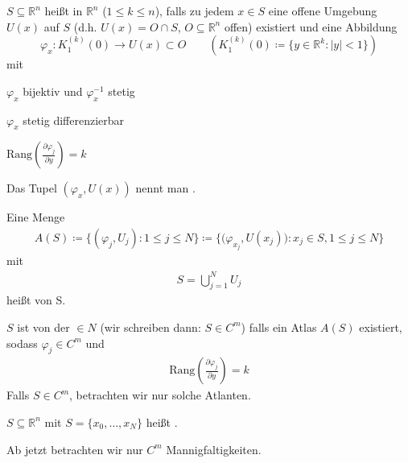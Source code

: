 \begin{theorem}[Definition] \label{thm:9.1}
  \begin{enum-arab}
    \item $S \subseteq \mathbb{R}^n$ heißt  in $\mathbb{R}^n$ ($1 \leq k \leq n$), falls zu jedem $x \in S$ eine offene Umgebung $U(x)$ auf $S$ (d.h. $U(x) = O \cap S$, $O \subseteq \mathbb{R}^n$ offen) existiert und eine Abbildung \[ \varphi_x : K_1^{(k)}(0) \to U(x) \subset O \qquad \left( K_1^{(k)}(0) \coloneq \{ y \in \mathbb{R}^k : |y| < 1 \} \right) \] mit
    \begin{enum-alph}
      \item $\varphi_x$ bijektiv und $\varphi_x^{-1}$ stetig
      \item $\varphi_x$ stetig differenzierbar
      \item  $ \mathrm{Rang}(\tfrac{\partial \varphi_j}{\partial y}) = k $
    \end{enum-alph}
    Das Tupel $(\varphi_x,U(x))$ nennt man .
    
    \item Eine Menge
    \begin{align*}
      A(S) \coloneq \big\{ (\varphi_j,U_j) : 1 \leq j \leq N \big\} 
      \coloneq \Big\{ \big(\varphi_{x_j},U(x_j)\big) : x_j \in S, 1 \leq j \leq N \Big\}
    \end{align*}
    mit
    \begin{align*}
      S = \bigcup\limits_{j=1}^{N} U_j
    \end{align*}
    heißt  von S.
    
    \item $S$ ist von der  $\in N$ (wir schreiben dann: $S \in C^m$) falls ein Atlas $A(S)$ existiert, sodass $\varphi_j \in C^m$ und 
      \begin{align*}
        \mathrm{Rang}(\tfrac{\partial \varphi_j}{\partial y}) = k
      \end{align*}
      Falls $S \in C^m$, betrachten wir nur solche Atlanten.
    
    \item $S \subseteq \mathbb{R}^n$ mit $S = \{ x_0,\ldots,x_N \}$ heißt  .
  \end{enum-arab}
\end{theorem}

\begin{theorem}[Vereinbarung] \label{thm:9.2}
  Ab jetzt betrachten wir nur $C^m$ Mannigfaltigkeiten.
\end{theorem}


